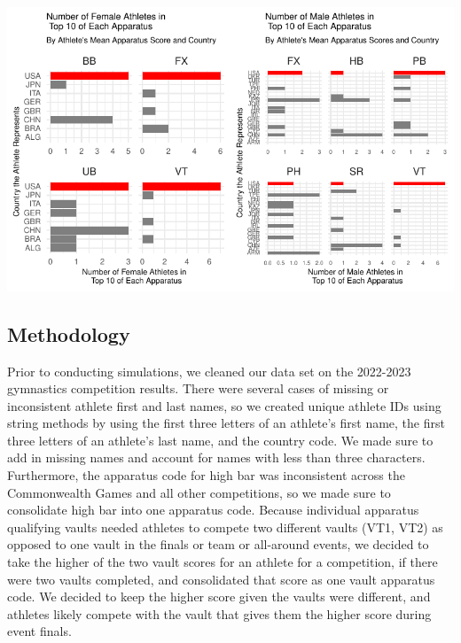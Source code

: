 \documentclass[
  letterpaper,
  DIV=11,
  numbers=noendperiod]{scrartcl}
\begin{document}
\includegraphics{Main_files/figure-pdf/top-10-athletes-1.pdf}

\hypertarget{methodology}{%
\subsection{Methodology}\label{methodology}}

Prior to conducting simulations, we cleaned our data set on the
2022-2023 gymnastics competition results. There were several cases of
missing or inconsistent athlete first and last names, so we created
unique athlete IDs using string methods by using the first three letters
of an athlete's first name, the first three letters of an athlete's last
name, and the country code. We made sure to add in missing names and
account for names with less than three characters. Furthermore, the
apparatus code for high bar was inconsistent across the Commonwealth
Games and all other competitions, so we made sure to consolidate high
bar into one apparatus code. Because individual apparatus qualifying
vaults needed athletes to compete two different vaults (VT1, VT2) as
opposed to one vault in the finals or team or all-around events, we
decided to take the higher of the two vault scores for an athlete for a
competition, if there were two vaults completed, and consolidated that
score as one vault apparatus code. We decided to keep the higher score
given the vaults were different, and athletes likely compete with the
vault that gives them the higher score during event finals.
\end{document}
